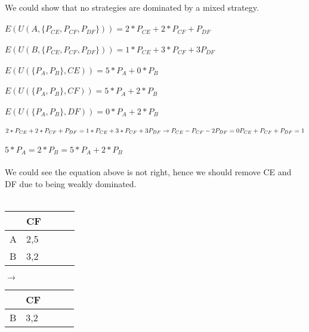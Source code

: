 \begin{enumerate}
\begin{latin}
\\\\
We could show that no strategies are dominated by a mixed strategy.
\\\\
$E(U(A,\{P_{CE},P_{CF},P_{DF}\})) = 2*P_{CE}+2*P_{CF}+P_{DF}$ \\\\
$E(U(B,\{P_{CE},P_{CF},P_{DF}\})) = 1*P_{CE}+3*P_{CF}+3P_{DF}$ \\\\
$E(U(\{P_{A},P_{B}\},CE)) = 5 * P_{A} + 0 * P_{B}$ \\\\
$E(U(\{P_{A},P_{B}\},CF)) = 5 * P_{A} + 2 * P_{B}$ \\\\
$E(U(\{P_{A},P_{B}\},DF)) = 0 * P_{A} + 2 * P_{B}$ \\\\
$2*P_{CE}+2*P_{CF}+P_{DF} = 1*P_{CE}+3*P_{CF}+3P_{DF}\rightarrow \\ P_{CE} - P_{CF} - 2P_{DF}=0 \\ P_{CE}+P_{CF}+P_{DF}=1$\\\\
$5 * P_{A} = 2 * P_{B} = 5 * P_{A} + 2 * P_{B}$\\\\
We could see the equation above is not right, hence we should remove CE and DF due to being weakly dominated. \\\\
\begin{tabular}{l | l | c | r | l | }
  & CF  \\
\hline
A & 2,5 \\
\hline
B & 3,2 \\
\hline
\end{tabular}
$ \rightarrow $
\begin{tabular}{l | l | c | r | l | }
  & CF  \\
\hline
B & 3,2 \\
\hline
\end{tabular}

\end{latin}
\end{enumerate}
